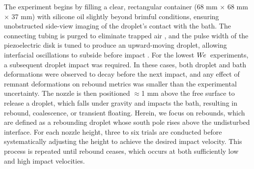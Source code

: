 \documentclass{jfm}
\newcommand{\We}{W\kern-0.15em e\,}
\begin{document}
The experiment begins by filling a clear, rectangular container (68 mm $\times$ 68 mm $\times$ 37 mm) with silicone oil slightly beyond brimful conditions, ensuring unobstructed side-view imaging of the droplet’s contact with the bath. The connecting tubing is purged to eliminate trapped air \citep{harris2015low}, and the pulse width of the piezoelectric disk is tuned to produce an upward-moving droplet, allowing interfacial oscillations to subside before impact \citep{GabbardEtAl2025}. For the lowest $\We$ experiments, a subsequent droplet impact was required. In these cases, both droplet and bath deformations were observed to decay before the next impact, and any effect of remnant deformations on rebound metrics was smaller than the experimental uncertainty. The nozzle is then positioned $\approx$1 mm above the free surface to release a droplet, which falls under gravity and impacts the bath, resulting in rebound, coalescence, or transient floating. Herein, we focus on rebounds, which are defined as a rebounding droplet whose south pole rises above the undisturbed interface. For each nozzle height, three to six trials are conducted before systematically adjusting the height to achieve the desired impact velocity. This process is repeated until rebound ceases, which occurs at both sufficiently low and high impact velocities.
\end{document}
